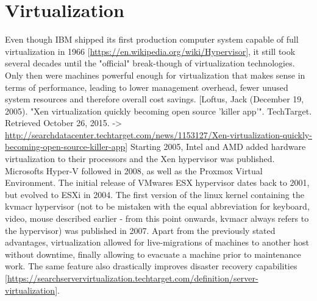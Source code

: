 
\section{Virtualization}
Even though IBM shipped its first production computer system capable of full virtualization in 1966 [\url{https://en.wikipedia.org/wiki/Hypervisor}], it still took several decades until the "official" break-though of virtualization technologies. Only then were machines powerful enough for virtualization that makes sense in terms of performance, leading to lower management overhead, fewer unused system resources and therefore overall cost savings. [Loftus, Jack (December 19, 2005). "Xen virtualization quickly becoming open source 'killer app'". TechTarget. Retrieved October 26, 2015. -> \url{http://searchdatacenter.techtarget.com/news/1153127/Xen-virtualization-quickly-becoming-open-source-killer-app}]
Starting 2005, Intel and AMD added hardware virtualization to their processors and the Xen hypervisor was published. Microsofts Hyper-V followed in 2008, as well as the Proxmox Virtual Environment. The initial release of VMwares ESX hypervisor dates back to 2001, but evolved to ESXi in 2004. The first version of the linux kernel containing the \gls{kvmacr} hypervisor (not to be mistaken with the equal abbreviation for keyboard, video, mouse described earlier - from this point onwards, \gls{kvmacr} always refers to the hypervisor) was published in 2007.
\newline
Apart from the previously stated advantages, virtualization allowed for live-migrations of machines to another host without downtime, finally allowing to evacuate a machine prior to maintenance work. The same feature also drastically improves disaster recovery capabilities [\url{https://searchservervirtualization.techtarget.com/definition/server-virtualization}].

